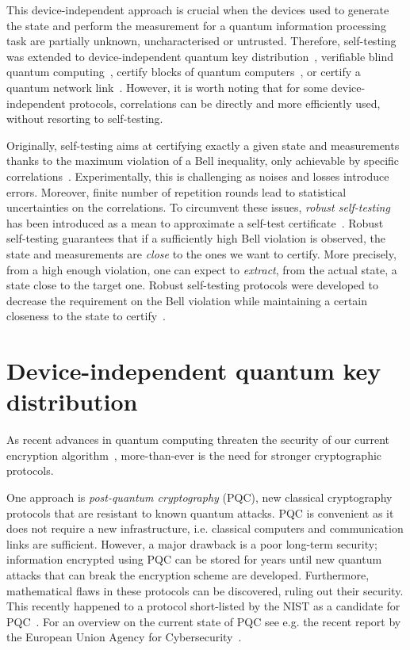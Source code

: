 \medbreak

This device-independent approach is crucial when the devices used to generate the state and perform the measurement for a quantum information processing task are partially unknown, uncharacterised or untrusted.
Therefore, self-testing was extended to device-independent quantum key distribution~\cite{Mayers2004}, verifiable blind quantum computing~\cite{Reichardt2013,Hajdusek2015,McKague2016}, certify blocks of quantum computers~\cite{Magniez2006,Sekatski2018}, or certify a quantum network link~\cite{Bancal2021}.
However, it is worth noting that for some device-independent protocols, correlations can be directly and more efficiently used, without resorting to self-testing.

\medbreak

Originally, self-testing aims at certifying exactly a given state and measurements thanks to the maximum violation of a Bell inequality, only achievable by specific correlations~\cite{Mayers2004}.
Experimentally, this is challenging as noises and losses introduce errors.
Moreover, finite number of repetition rounds lead to statistical uncertainties on the correlations.
To circumvent these issues, \textit{robust self-testing} has been introduced as a mean to approximate a self-test certificate~\cite{Kaniewski2016}.
Robust self-testing guarantees that if a sufficiently high Bell violation is observed, the state and measurements are \textit{close} to the ones we want to certify.
More precisely, from a high enough violation, one can expect to \textit{extract}, from the actual state, a state close to the target one.
Robust self-testing protocols were developed to decrease the requirement on the Bell violation while maintaining a certain closeness to the state to certify~\cite{Bancal2015,Kaniewski2016,Kaniewski2017,Valcarce2022}.

\section{Device-independent quantum key distribution}

As recent advances in quantum computing threaten the security of our current encryption algorithm~\cite{Shor1994,Gouzien2021,Gouzien2023}, more-than-ever is the need for stronger cryptographic protocols. 

One approach is \textit{post-quantum cryptography} (PQC), new classical cryptography protocols that are resistant to known quantum attacks.
PQC is convenient as it does not require a new infrastructure, i.e. classical computers and communication links are sufficient. 
However, a major drawback is a poor long-term security; information encrypted using PQC can be stored for years until new quantum attacks that can break the encryption scheme are developed. 
Furthermore, mathematical flaws in these protocols can be discovered, ruling out their security.
This recently happened to a protocol short-listed by the NIST as a candidate for PQC~\cite{Castryck2022}.
For an overview on the current state of PQC see e.g. the recent report by the European Union Agency for Cybersecurity~\cite{EUAC2021}.

